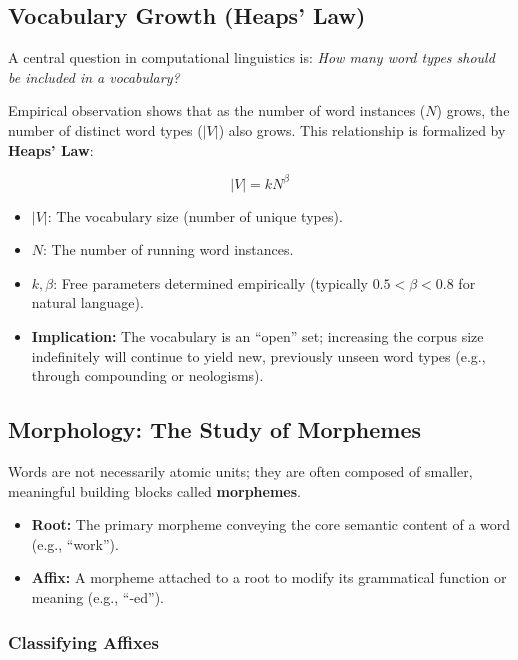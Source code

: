 \documentclass[
  italian,
  11pt,
]{article}
\providecommand{\tightlist}{%
  \setlength{\itemsep}{0pt}\setlength{\parskip}{0pt}}
\begin{document}
\subsection{Vocabulary Growth (Heaps'
Law)}\label{vocabulary-growth-heaps-law}

A central question in computational linguistics is: \emph{How many word
types should be included in a vocabulary?}

Empirical observation shows that as the number of word instances (\(N\))
grows, the number of distinct word types (\(|V|\)) also grows. This
relationship is formalized by \textbf{Heaps' Law}:

\[|V| = kN^{\beta}\]

\begin{itemize}
\tightlist
\item
  \(|V|\): The vocabulary size (number of unique types).
\item
  \(N\): The number of running word instances.
\item
  \(k, \beta\): Free parameters determined empirically (typically
  \(0.5 < \beta < 0.8\) for natural language).
\item
  \textbf{Implication:} The vocabulary is an ``open'' set; increasing
  the corpus size indefinitely will continue to yield new, previously
  unseen word types (e.g., through compounding or neologisms).
\end{itemize}

\subsection{Morphology: The Study of
Morphemes}\label{morphology-the-study-of-morphemes}

Words are not necessarily atomic units; they are often composed of
smaller, meaningful building blocks called \textbf{morphemes}.

\begin{itemize}
\tightlist
\item
  \textbf{Root:} The primary morpheme conveying the core semantic
  content of a word (e.g., ``work'').
\item
  \textbf{Affix:} A morpheme attached to a root to modify its
  grammatical function or meaning (e.g., ``-ed'').
\end{itemize}

\subsubsection{Classifying Affixes}\label{classifying-affixes}
\end{document}
